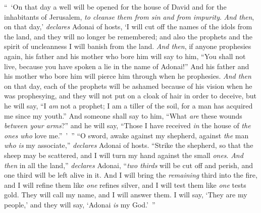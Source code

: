 \begin{biblechapter} %
\verse “ ‘On that day a well will be opened for the house of David and for the inhabitants of Jerusalem, \textit{to cleanse them from sin and from impurity}.
\verse \textit{And then}, on that day,’ \textit{declares} Adonai of hosts, ‘I will cut off the names of the idols from the land, and they will no longer be remembered; and also the prophets and the spirit of uncleanness I will banish from the land.
\verse \textit{And then}, if anyone prophesies again, his father and his mother who bore him will say to him, “You shall not live, because you have spoken a lie in the name of Adonai!” And his father and his mother who bore him will pierce him through when he prophesies.
\verse \textit{And then} on that day, each of the prophets will be ashamed because of his vision when he was prophesying, and they will not put on a cloak of hair in order to deceive,
\verse but he will say, “I \textit{am} not a prophet; I am a tiller of the soil, for a man has acquired me since my youth.”
\verse And someone shall say to him, “What \textit{are} these wounds \textit{between your arms}?” and he will say, “Those I have received \textit{in} the house of \textit{the ones who} love me.” ’ ”
 “O sword, awake against my shepherd, 
against \textit{the} man \textit{who is} my associate,” 
\textit{declares} Adonai of hosts. 
“Strike the shepherd, 
so that the sheep may be scattered, 
and I will turn my hand against the small \textit{ones}.
\verse \textit{And then} in all the land,” \textit{declares} Adonai, 
“\textit{two thirds} will be cut off and perish, 
and one third will be left alive in it.
\verse And I will bring the \textit{remaining} third into the fire, 
and I will refine them like \textit{one} refines silver, 
and I will test them like \textit{one} tests gold. 
They will call my name, 
and I will answer them. 
I will say, ‘They are my people,’ 
and they will say, ‘Adonai \textit{is} my God.’ ”
\end{biblechapter}

